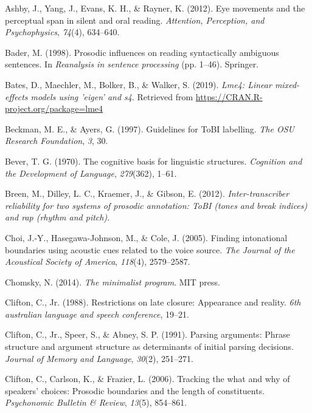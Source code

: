 \documentclass[11pt,oneside]{book}
\begin{document}
\hypertarget{refs}{}
\leavevmode\hypertarget{ref-ashby2012eye}{}%
Ashby, J., Yang, J., Evans, K. H., \& Rayner, K. (2012). Eye movements and the perceptual span in silent and oral reading. \emph{Attention, Perception, and Psychophysics}, \emph{74}(4), 634--640.

\leavevmode\hypertarget{ref-Bader1998-ts}{}%
Bader, M. (1998). Prosodic influences on reading syntactically ambiguous sentences. In \emph{Reanalysis in sentence processing} (pp. 1--46). Springer.

\leavevmode\hypertarget{ref-R-lme4}{}%
Bates, D., Maechler, M., Bolker, B., \& Walker, S. (2019). \emph{Lme4: Linear mixed-effects models using 'eigen' and s4}. Retrieved from \url{https://CRAN.R-project.org/package=lme4}

\leavevmode\hypertarget{ref-Beckman1997-eu}{}%
Beckman, M. E., \& Ayers, G. (1997). Guidelines for ToBI labelling. \emph{The OSU Research Foundation}, \emph{3}, 30.

\leavevmode\hypertarget{ref-bever1970}{}%
Bever, T. G. (1970). The cognitive basis for linguistic structures. \emph{Cognition and the Development of Language}, \emph{279}(362), 1--61.

\leavevmode\hypertarget{ref-agreements}{}%
Breen, M., Dilley, L. C., Kraemer, J., \& Gibson, E. (2012). \emph{Inter-transcriber reliability for two systems of prosodic annotation: ToBI (tones and break indices) and rap (rhythm and pitch)}.

\leavevmode\hypertarget{ref-choi2005finding}{}%
Choi, J.-Y., Hasegawa-Johnson, M., \& Cole, J. (2005). Finding intonational boundaries using acoustic cues related to the voice source. \emph{The Journal of the Acoustical Society of America}, \emph{118}(4), 2579--2587.

\leavevmode\hypertarget{ref-chomsky2014minimalist}{}%
Chomsky, N. (2014). \emph{The minimalist program}. MIT press.

\leavevmode\hypertarget{ref-clifton1988restrictions}{}%
Clifton, C., Jr. (1988). Restrictions on late closure: Appearance and reality. \emph{6th australian language and speech conference}, 19--21.

\leavevmode\hypertarget{ref-cliftonEtAl1991}{}%
Clifton, C., Jr., Speer, S., \& Abney, S. P. (1991). Parsing arguments: Phrase structure and argument structure as determinants of initial parsing decisions. \emph{Journal of Memory and Language}, \emph{30}(2), 251--271.

\leavevmode\hypertarget{ref-lengthCCFL}{}%
Clifton, C., Carlson, K., \& Frazier, L. (2006). Tracking the what and why of speakers' choices: Prosodic boundaries and the length of constituents. \emph{Psychonomic Bulletin \& Review}, \emph{13}(5), 854--861.
\end{document}
